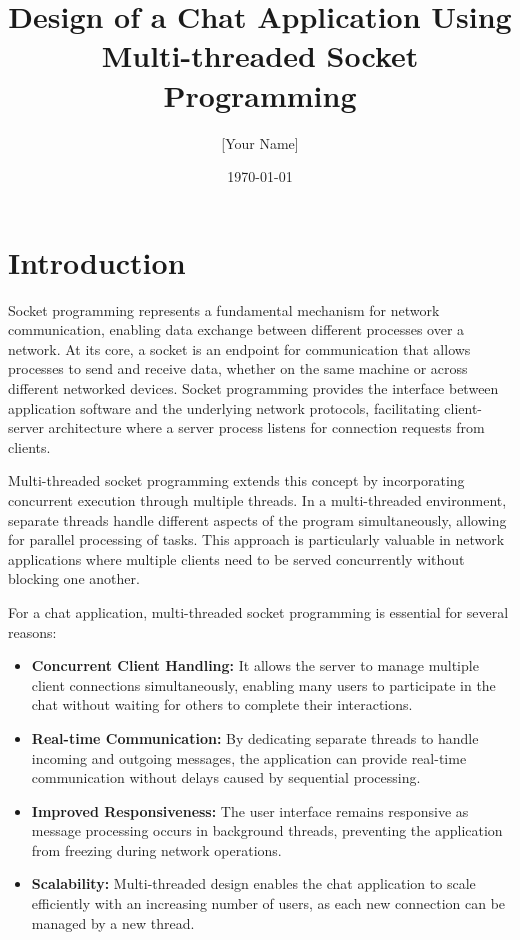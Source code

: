\documentclass[12pt,a4paper]{article}
\title{\textbf{Design of a Chat Application Using\\Multi-threaded Socket Programming}}
\author{[Your Name] \\ [Your ID]}
\date{\today}
\begin{document}
\maketitle
\tableofcontents
\newpage

\section{Introduction}
Socket programming represents a fundamental mechanism for network communication, enabling data exchange between different processes over a network. At its core, a socket is an endpoint for communication that allows processes to send and receive data, whether on the same machine or across different networked devices. Socket programming provides the interface between application software and the underlying network protocols, facilitating client-server architecture where a server process listens for connection requests from clients.

Multi-threaded socket programming extends this concept by incorporating concurrent execution through multiple threads. In a multi-threaded environment, separate threads handle different aspects of the program simultaneously, allowing for parallel processing of tasks. This approach is particularly valuable in network applications where multiple clients need to be served concurrently without blocking one another.

For a chat application, multi-threaded socket programming is essential for several reasons:

\begin{itemize}
    \item \textbf{Concurrent Client Handling:} It allows the server to manage multiple client connections simultaneously, enabling many users to participate in the chat without waiting for others to complete their interactions.
    
    \item \textbf{Real-time Communication:} By dedicating separate threads to handle incoming and outgoing messages, the application can provide real-time communication without delays caused by sequential processing.
    
    \item \textbf{Improved Responsiveness:} The user interface remains responsive as message processing occurs in background threads, preventing the application from freezing during network operations.
    
    \item \textbf{Scalability:} Multi-threaded design enables the chat application to scale efficiently with an increasing number of users, as each new connection can be managed by a new thread.
\end{itemize}
\end{document}
